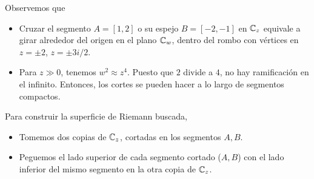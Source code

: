 \begin{solution}
\begin{itemize}
\begin{enumerate}[label=\alph*)]
        Observemos que
        \begin{itemize}
            \item Cruzar el segmento $A = [1, 2]$ o su espejo $B = [-2, -1]$ en $\mathbb C_z$ equivale a girar alrededor del origen en el plano $\mathbb C_w$, dentro del rombo con vértices en $z = \pm 2$, $z = \pm 3i/2$.
            
            \item Para $z \gg 0$, tenemos $w^2 \approx z^4$. Puesto que $2$ divide a $4$, no hay ramificación en el infinito. Entonces, los cortes se pueden hacer a lo largo de segmentos compactos.
        \end{itemize}
        
        Para construir la superficie de Riemann buscada,
        \begin{itemize}
            \item Tomemos dos copias de $\mathbb C_z$, cortadas en los segmentos $A, B$.
            \item Peguemos el lado superior de cada segmento cortado ($A, B$) con el lado inferior del mismo segmento en la otra copia de $\mathbb C_z$.
        \end{itemize}
        

\end{enumerate}
\end{itemize}
\end{solution}
